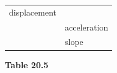 \begin{enumerate}[noitemsep, label=\textbf{\arabic*}. ]
{{\begin{center}
\begin{tabular}[t]{|l|l|}
        displacement%
     \tabularnewline\cline{1-1}\cline{2-2}
    
    
         &
    
    
        acceleration%
     \tabularnewline\cline{1-1}\cline{2-2}
    
    
         &
    
    
        slope%
     \tabularnewline\cline{1-1}\cline{2-2}
    \end{tabular}
      \end{center}
    \begin{center}{\small\bfseries Table 20.5}\end{center}
    
    \addtocounter{footnote}{-0}
    
          }{ %
        
    
        \begin{center}
      
      \label{m38796*uid180}
      

\end{center}}}
\end{enumerate}
